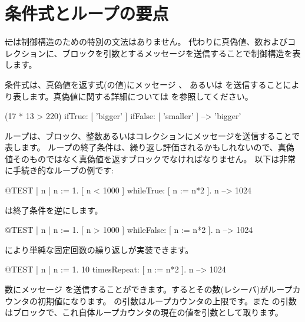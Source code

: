 \documentclass[a4paper,10pt,twoside]{book}
\begin{document}
\section{条件式とループの要点}

\st には制御構造のための特別の文法はありません。
代わりに真偽値、数およびコレクションに、ブロックを引数とするメッセージを送信することで制御構造を表します。

条件式は、真偽値を返す式(の値)にメッセージ 、 あるいは  を送信することにより表します。真偽値に関する詳細については を参照してください。

\begin{code}{}
(17 * 13 > 220)
   ifTrue: [ 'bigger' ]
   ifFalse: [ 'smaller' ] --> 'bigger'
\end{code}

ループは、ブロック、整数あるいはコレクションにメッセージを送信することで表します。
ループの終了条件は、繰り返し評価されるかもしれないので、真偽値そのものではなく真偽値を返すブロックでなければなりません。
以下は非常に手続き的なループの例です:

\begin{code}{@TEST | n |}
n := 1.
[ n < 1000 ] whileTrue: [ n := n*2 ].
n --> 1024
\end{code}

\noindent
{} は終了条件を逆にします。
\begin{code}{@TEST | n |}
n := 1.
[ n > 1000 ] whileFalse: [ n := n*2 ].
n --> 1024
\end{code}

\noindent
{} により単純な固定回数の繰り返しが実装できます。

\begin{code}{@TEST | n |}
n := 1.
10 timesRepeat: [ n := n*2 ].
n --> 1024
\end{code}

数にメッセージ  を送信することができます。するとその数(レシーバ)がループカウンタの初期値になります。
 の引数はループカウンタの上限です。また  の引数はブロックで、これ自体ループカウンタの現在の値を引数として取ります。
\end{document}
